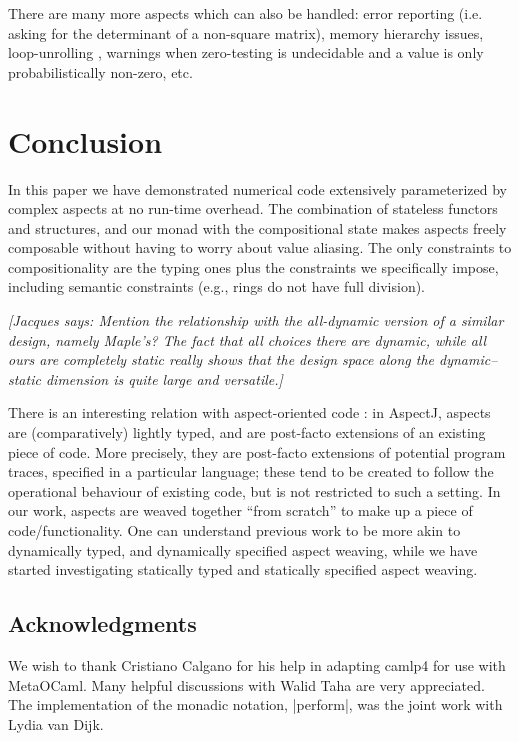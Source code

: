 \documentclass[draft]{elsart}
\newcommand{\jacques}[1]{{\it [Jacques says: #1]}}
\begin{document}
There are many more aspects which can also be handled:
error reporting (i.e. asking for the determinant of a 
non-square matrix), memory hierarchy issues, loop-unrolling
\cite{Padua:MetaOcaml:04},
warnings when zero-testing is undecidable and
a value is only probabilistically non-zero, etc.

\section{Conclusion}\label{conclusion}
In this paper we have demonstrated numerical code extensively parameterized
by complex aspects at no run-time overhead.  The combination of
stateless functors and structures, and our monad with the
compositional state makes aspects freely composable without having to
worry about value aliasing. The only constraints to compositionality
are the typing ones plus the constraints we specifically
impose, including semantic constraints (e.g., rings do not have full
division).

\jacques{Mention the relationship with the all-dynamic version of a 
similar design, namely Maple's?  The fact that all choices there are
dynamic, while all ours are completely static really shows that the
design space along the dynamic--static dimension is quite large and
versatile.}

There is an interesting relation with aspect-oriented code
\cite{kiczales97aspectoriented}: in AspectJ, 
aspects are (comparatively) lightly typed, and are post-facto extensions of an
existing piece of code.  More precisely, they are post-facto extensions of
potential program traces, specified in a particular language; these tend
to be created to follow the operational behaviour of existing code, but
is not restricted to such a setting.
In our work, aspects are weaved together ``from scratch'' to
make up a piece of code/functionality.  One can understand previous work to be
more akin to dynamically typed, and dynamically specified aspect weaving, while
we have started investigating statically typed and statically specified
aspect weaving.

\subsection*{Acknowledgments}
We wish to thank Cristiano Calgano for his help in adapting camlp4 for
use with MetaOCaml. Many helpful discussions with Walid Taha are very
appreciated. The implementation of the monadic notation, |perform|,
was the joint work with Lydia van Dijk.
\end{document}
